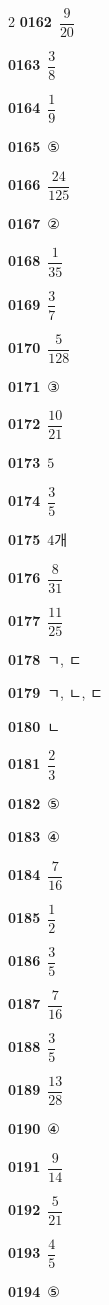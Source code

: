 \documentclass[10pt,a4paper]{article}
\begin{document}
\begin{multicols}{2}
\noindent\textbf{0162}\ $\dfrac{9}{20}$\par
\noindent\textbf{0163}\ $\dfrac{3}{8}$\par
\noindent\textbf{0164}\ $\dfrac{1}{9}$\par
\noindent\textbf{0165}\ ⑤\par
\noindent\textbf{0166}\ $\dfrac{24}{125}$\par
\noindent\textbf{0167}\ ②\par
\noindent\textbf{0168}\ $\dfrac{1}{35}$\par
\noindent\textbf{0169}\ $\dfrac{3}{7}$\par
\noindent\textbf{0170}\ $\dfrac{5}{128}$\par
\noindent\textbf{0171}\ ③\par
\noindent\textbf{0172}\ $\dfrac{10}{21}$\par
\noindent\textbf{0173}\ $5$\par
\noindent\textbf{0174}\ $\dfrac{3}{5}$\par
\noindent\textbf{0175}\ $4$개\par
\noindent\textbf{0176}\ $\dfrac{8}{31}$\par
\noindent\textbf{0177}\ $\dfrac{11}{25}$\par
\noindent\textbf{0178}\ ㄱ, ㄷ\par
\noindent\textbf{0179}\ ㄱ, ㄴ, ㄷ\par
\noindent\textbf{0180}\ ㄴ\par
\noindent\textbf{0181}\ $\dfrac{2}{3}$\par
\noindent\textbf{0182}\ ⑤\par
\noindent\textbf{0183}\ ④\par
\noindent\textbf{0184}\ $\dfrac{7}{16}$\par
\noindent\textbf{0185}\ $\dfrac{1}{2}$\par
\noindent\textbf{0186}\ $\dfrac{3}{5}$\par
\noindent\textbf{0187}\ $\dfrac{7}{16}$\par
\noindent\textbf{0188}\ $\dfrac{3}{5}$\par
\noindent\textbf{0189}\ $\dfrac{13}{28}$\par
\noindent\textbf{0190}\ ④\par
\noindent\textbf{0191}\ $\dfrac{9}{14}$\par
\noindent\textbf{0192}\ $\dfrac{5}{21}$\par
\noindent\textbf{0193}\ $\dfrac{4}{5}$\par
\noindent\textbf{0194}\ ⑤\par

\end{multicols}
\end{document}
